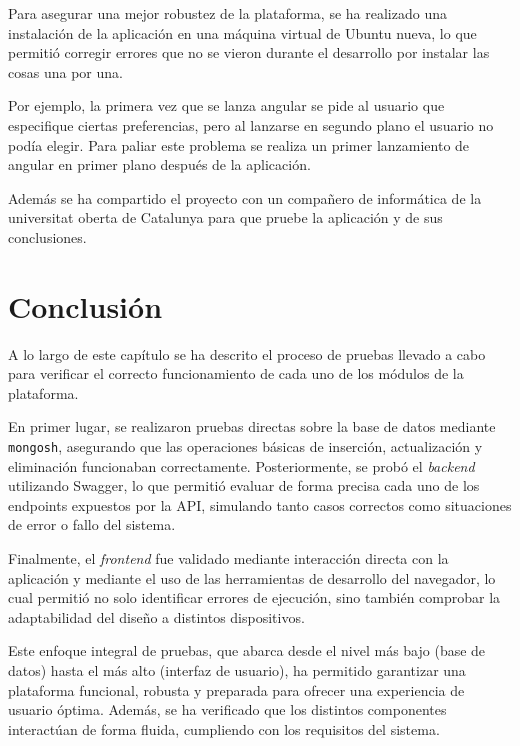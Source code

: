 Para asegurar una mejor robustez de la plataforma, se ha realizado una instalación de la aplicación en una máquina virtual de Ubuntu nueva, lo que permitió corregir errores que no se vieron durante el desarrollo por instalar las cosas una por una. 

Por ejemplo, la primera vez que se lanza angular se pide al usuario que especifique ciertas preferencias, pero al lanzarse en segundo plano el usuario no podía elegir. Para paliar este problema se realiza un primer lanzamiento de angular en primer plano después de la aplicación.


Además se ha compartido el proyecto con un compañero de informática de la universitat oberta de Catalunya para que pruebe la aplicación y de sus conclusiones. 

\newpage

\section{Conclusión}

A lo largo de este capítulo se ha descrito el proceso de pruebas llevado a cabo para verificar el correcto funcionamiento de cada uno de los módulos de la plataforma.

En primer lugar, se realizaron pruebas directas sobre la base de datos mediante \texttt{mongosh}, asegurando que las operaciones básicas de inserción, actualización y eliminación funcionaban correctamente. Posteriormente, se probó el \textit{backend} utilizando Swagger, lo que permitió evaluar de forma precisa cada uno de los endpoints expuestos por la API, simulando tanto casos correctos como situaciones de error o fallo del sistema.

Finalmente, el \textit{frontend} fue validado mediante interacción directa con la aplicación y mediante el uso de las herramientas de desarrollo del navegador, lo cual permitió no solo identificar errores de ejecución, sino también comprobar la adaptabilidad del diseño a distintos dispositivos.

Este enfoque integral de pruebas, que abarca desde el nivel más bajo (base de datos) hasta el más alto (interfaz de usuario), ha permitido garantizar una plataforma funcional, robusta y preparada para ofrecer una experiencia de usuario óptima. Además, se ha verificado que los distintos componentes interactúan de forma fluida, cumpliendo con los requisitos del sistema.

